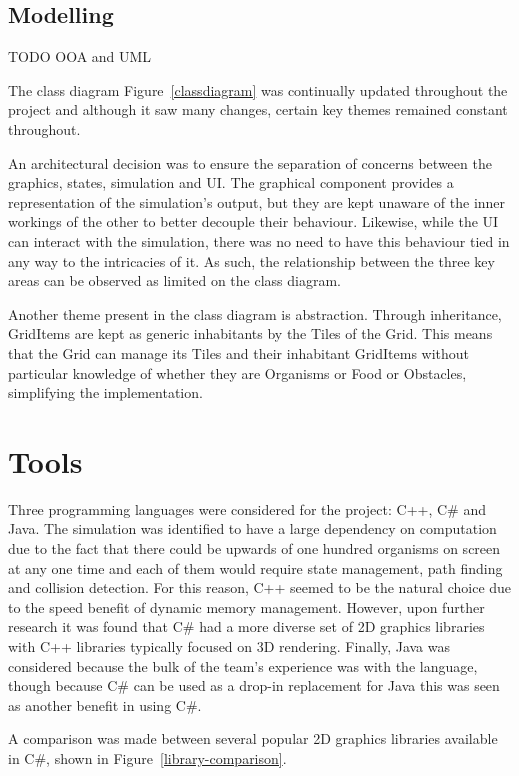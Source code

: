 \documentclass[a4paper, oneside, 11pt]{report}
\begin{document}
\subsection{Modelling}

TODO OOA and UML

The class diagram Figure~\ref{classdiagram} was continually updated throughout the project and although it saw many changes, certain key themes remained constant throughout.

An architectural decision was to ensure the separation of concerns between the graphics, states, simulation and UI. The graphical component provides a representation of the simulation's output, but they are kept unaware of the inner workings of the other to better decouple their behaviour. Likewise, while the UI can interact with the simulation, there was no need to have this behaviour tied in any way to the intricacies of it. As such, the relationship between the three key areas can be observed as limited on the class diagram.

Another theme present in the class diagram is abstraction. Through inheritance, GridItems are kept as generic inhabitants by the Tiles of the Grid. This means that the Grid can manage its Tiles and their inhabitant GridItems without particular knowledge of whether they are Organisms or Food or Obstacles, simplifying the implementation.

\section{Tools}\label{tools}
Three programming languages were considered for the project: C++, C\# and Java. The simulation was identified to have a large dependency on computation due to the fact that there could be upwards of one hundred organisms on screen at any one time and each of them would require state management, path finding and collision detection. For this reason, C++ seemed to be the natural choice due to the speed benefit of dynamic memory management. However, upon further research it was found that C\# had a more diverse set of 2D graphics libraries with C++ libraries typically focused on 3D rendering. Finally, Java was considered because the bulk of the team's experience was with the language, though because C\# can be used as a drop-in replacement for Java this was seen as another benefit in using C\#.

A comparison was made between several popular 2D graphics libraries available in C\#, shown in Figure~\ref{library-comparison}.
\end{document}
